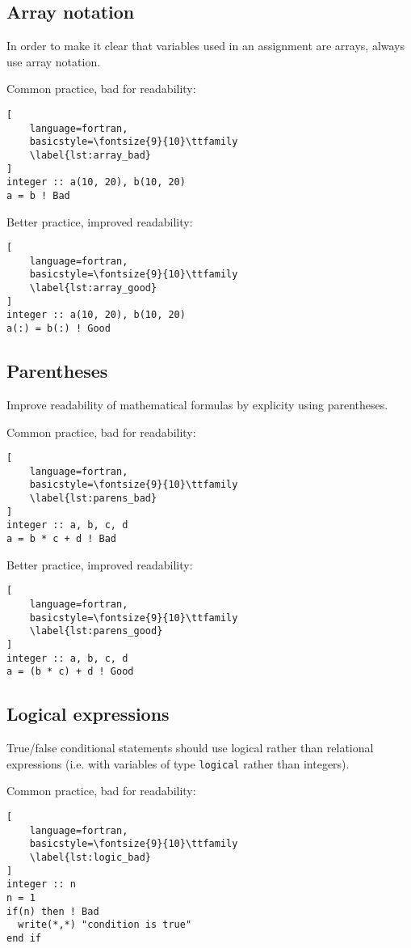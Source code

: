 \documentclass[11pt]{article}
\begin{document}
\subsection{Array notation}
In order to make it clear that variables used in an assignment are arrays, always use array notation.

Common practice, bad for readability:
\begin{lstlisting}[
	language=fortran,
    basicstyle=\fontsize{9}{10}\ttfamily
    \label{lst:array_bad}
]
integer :: a(10, 20), b(10, 20)
a = b ! Bad
\end{lstlisting}

Better practice, improved readability:
\begin{lstlisting}[
	language=fortran,
    basicstyle=\fontsize{9}{10}\ttfamily
    \label{lst:array_good}
]
integer :: a(10, 20), b(10, 20)
a(:) = b(:) ! Good
\end{lstlisting}

\subsection{Parentheses}
Improve readability of mathematical formulas by explicity using parentheses.

Common practice, bad for readability:
\begin{lstlisting}[
	language=fortran,
    basicstyle=\fontsize{9}{10}\ttfamily
    \label{lst:parens_bad}
]
integer :: a, b, c, d
a = b * c + d ! Bad
\end{lstlisting}

Better practice, improved readability:
\begin{lstlisting}[
	language=fortran,
    basicstyle=\fontsize{9}{10}\ttfamily
    \label{lst:parens_good}
]
integer :: a, b, c, d
a = (b * c) + d ! Good
\end{lstlisting}

\subsection{Logical expressions}
True/false conditional statements should use logical rather than relational expressions (i.e. with variables of 
type \texttt{logical} rather than integers). 

Common practice, bad for readability:
\begin{lstlisting}[
	language=fortran,
    basicstyle=\fontsize{9}{10}\ttfamily
    \label{lst:logic_bad}
]
integer :: n
n = 1
if(n) then ! Bad
  write(*,*) "condition is true"
end if
\end{lstlisting}
\end{document}

